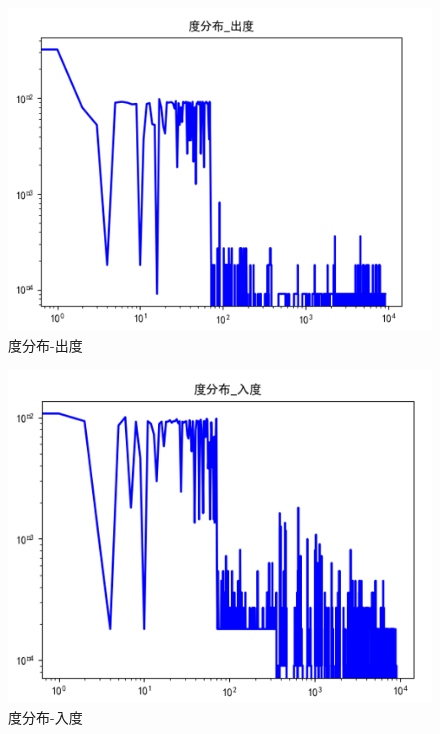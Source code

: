 \begin{figure}[h]
	\centering
	\includegraphics[scale=0.5]{figures/9.png}
	\caption{度分布-出度}
	\label{fig:1}
\end{figure}

\begin{figure}[h]
	\centering
	\includegraphics[scale=0.5]{figures/10.png}
	\caption{度分布-入度}
	\label{fig:1}
\end{figure}

